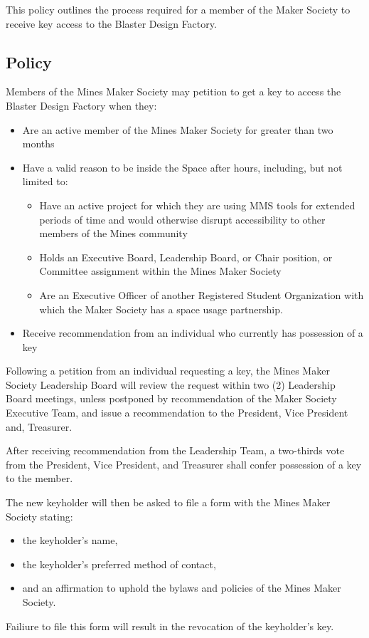 \documentclass[12pt,letterpaper]{article}
\begin{document}
This policy outlines the process required for a member of the Maker Society to receive key access to the Blaster Design Factory.

\subsection{Policy}

Members of the Mines Maker Society may petition to get a key to access the Blaster Design Factory when they:

\begin{itemize}
    \item Are an active member of the Mines Maker Society for greater than two months
    \item Have a valid reason to be inside the Space after hours, including, but not limited to:
    \begin{itemize}
        \item Have an active project for which they are using MMS tools for extended periods of time and would otherwise disrupt accessibility to other members of the Mines community
        \item Holds an Executive Board, Leadership Board, or Chair position, or Committee assignment within the Mines Maker Society
        \item Are an Executive Officer of another Registered Student Organization with which the Maker Society has a space usage partnership.
    \end{itemize}
    \item Receive recommendation from an individual who currently has possession of a key
\end{itemize}

Following a petition from an individual requesting a key, the Mines Maker Society Leadership Board will review the request within two (2) Leadership Board meetings, unless postponed by recommendation of the Maker Society Executive Team, and issue a recommendation to the President, Vice President and, Treasurer.

After receiving recommendation from the Leadership Team, a two-thirds vote from the President, Vice President, and Treasurer shall confer possession of a key to the member.

The new keyholder will then be asked to file a form with the Mines Maker Society stating:
\begin{itemize}
    \item the keyholder's name,
    \item the keyholder's preferred method of contact,
    \item and an affirmation to uphold the bylaws and policies of the Mines Maker Society.
\end{itemize}
Failiure to file this form will result in the revocation of the keyholder's key.
\end{document}
